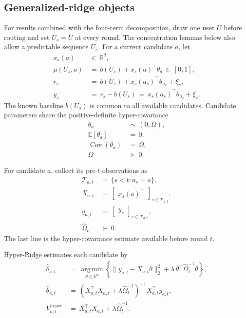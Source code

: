 \documentclass{article} %
\begin{document}
\subsection{Generalized-ridge objects}

For results combined with the four-term decomposition, draw one user \(U\)
before routing and set \(U_s=U\) at every round. The concentration lemmas below
also allow a predictable sequence \(U_s\). For a current candidate \(a\), let
\begin{align}
x_s(a)
&\,\in\,
\mathbb R^d,
\label{eq:hyper-feature}
\\
\mu(U_s,a)
&\,=\,
b(U_s)+x_s(a)^\top\theta_a
\,\in\,
[0,1],
\label{eq:hyper-linear-model-app}
\\
r_s
&\,=\,
b(U_s)+x_s(a_s)^\top\theta_{a_s}+\xi_s,
\label{eq:hyper-reward}
\\
y_s
&\,=\,
r_s-b(U_s)
\,=\,
x_s(a_s)^\top\theta_{a_s}+\xi_s.
\label{eq:hyper-centered-reward}
\end{align}
The known baseline \(b(U_s)\) is common to all available candidates.
Candidate parameters share the positive-definite hyper-covariance
\begin{align}
\theta_a
&\,\sim\,
(0,\Omega),
\label{eq:hyper-random-effects}
\\
\mathbb E[\theta_a]
&\,=\,
0,
\label{eq:hyper-random-effects-mean}
\\
\operatorname{Cov}(\theta_a)
&\,=\,
\Omega,
\label{eq:hyper-random-effects-cov}
\\
\Omega
&\,\succ\,
0.
\label{eq:hyper-omega-pd}
\end{align}

For candidate \(a\), collect its pre-\(t\) observations as
\begin{align}
\mathcal T_{a,t}
&\,=\,
\{s<t:a_s=a\},
\label{eq:hyper-index-set}
\\
X_{a,t}
&\,=\,
\begin{bmatrix}
x_s(a)^\top
\end{bmatrix}_{s\in\mathcal T_{a,t}},
\label{eq:hyper-design-app}
\\
y_{a,t}
&\,=\,
\begin{bmatrix}
y_s
\end{bmatrix}_{s\in\mathcal T_{a,t}},
\label{eq:hyper-response}
\\
\widehat\Omega_t
&\,\succ\,
0.
\label{eq:hyper-omega-hat}
\end{align}
The last line is the hyper-covariance estimate available before round \(t\).

Hyper-Ridge estimates each candidate by
\begin{align}
\widehat{\theta}_{a,t}
&\,=\,
\operatorname*{arg\,min}_{\theta\in\mathbb{R}^d}
\left\{
\|y_{a,t}-X_{a,t}\theta\|_2^2
+
\lambda\,\theta^\top\widehat{\Omega}_t^{-1}\theta
\right\},
\label{eq:hyper-estimator-argmin}
\\
\widehat{\theta}_{a,t}
&\,=\,
\left(
X_{a,t}^\top X_{a,t}
+
\lambda \widehat{\Omega}_t^{-1}
\right)^{-1}
X_{a,t}^\top y_{a,t},
\label{eq:hyper-estimator-closed}
\\
V_{a,t}^{\mathrm{hyper}}
&\,=\,
X_{a,t}^\top X_{a,t}
+
\lambda\widehat{\Omega}_t^{-1}.
\label{eq:hyper-vhat}
\end{align}
\end{document}
